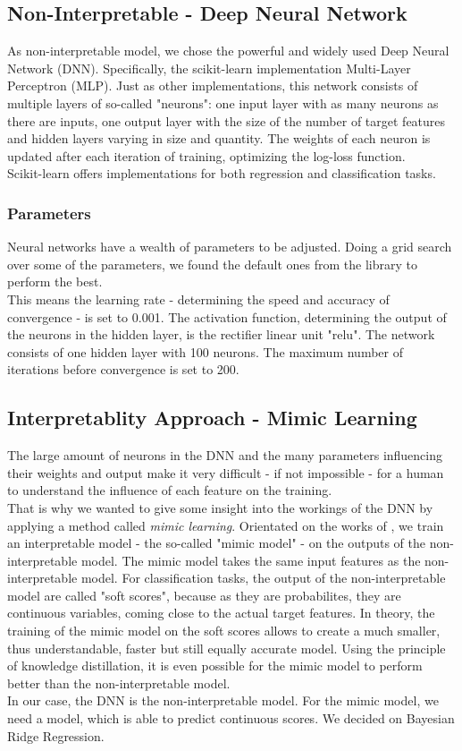 \documentclass[conference,compsoc]{IEEEtran}
\begin{document}
\subsection{Non-Interpretable - Deep Neural Network}
As non-interpretable model, we chose the powerful and widely used Deep Neural Network (DNN). 
Specifically, the scikit-learn implementation Multi-Layer Perceptron (MLP). 
Just as other implementations, this network consists of multiple layers of so-called "neurons": one input layer with as many neurons as there are inputs, one output layer with the size of the number of target features and hidden layers varying in size and quantity. 
The weights of each neuron is updated after each iteration of training, optimizing the log-loss function. \\
Scikit-learn offers implementations for both regression and classification tasks.
\subsubsection{Parameters}
Neural networks have a wealth of parameters to be adjusted. 
Doing a grid search over some of the parameters, we found the default ones from the library to perform the best.\\
This means the learning rate - determining the speed and accuracy of convergence - is set to 0.001. 
The activation function, determining the output of the neurons in the hidden layer, is the rectifier linear unit "relu". 
The network consists of one hidden layer with 100 neurons. 
The maximum number of iterations before convergence is set to 200.

\subsection{Interpretablity Approach - Mimic Learning}
The large amount of neurons in the DNN and the many parameters influencing their weights and output make it very difficult - if not impossible - for a human to understand the influence of each feature on the training. \\
That is why we wanted to give some insight into the workings of the DNN by applying a method called \emph{mimic learning}. 
Orientated on the works of \cite{Che2016}, we train an interpretable model - the so-called "mimic model" - on the outputs of the non-interpretable model.
The mimic model takes the same input features as the non-interpretable model.
For classification tasks, the output of the non-interpretable model are called "soft scores", because as they are probabilites, they are continuous variables, coming close to the actual target features.
In theory, the training of the mimic model on the soft scores allows to create a much smaller, thus understandable, faster but still equally accurate model.
Using the principle of knowledge distillation, it is even possible for the mimic model to perform better than the non-interpretable model. \\
In our case, the DNN is the non-interpretable model.
For the mimic model, we need a model, which is able to predict continuous scores.
We decided on Bayesian Ridge Regression.
\end{document}
